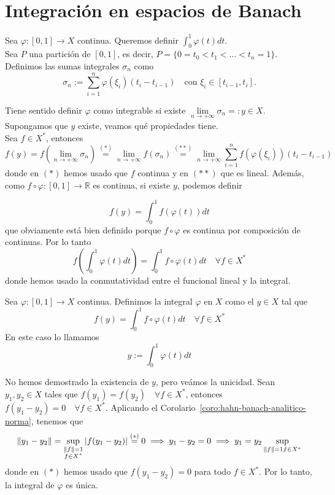 \section{Integración en espacios de Banach}


\noindent 
Sea $\varphi: [0, 1] \to X$ continua. Queremos definir $\int_{0}^{1} \varphi(t) dt$. \\

\noindent 
Sea $P$ una partición de $[0, 1]$, es decir, $P = \{0 = t_0 < t_1 < \dots < t_n = 1\}$. Definimos las sumas integrales $\sigma_n$ como
\[ \sigma_n := \sum_{i=1}^{n} \varphi(\xi_i)(t_i - t_{i-1}) \quad \text{con } \xi_i \in [t_{i-1}, t_i]. \]

\vspace{0.4cm}

\noindent 
Tiene sentido definir $\varphi$ como integrable si existe $\lim\limits_{n \to +\infty} \sigma_n =: y \in X$. Supongamos que $y$ existe, veamos qué propiedades tiene. \\

\noindent 
Sea $f \in X^*$, entonces 
\begin{equation*}
    f(y)=f\left(\lim_{n\to +\infty}\sigma_n\right) \overset{(*)}{=} \lim_{n\to + \infty} f(\sigma_n) \overset{(**)}{=} \lim_{n \to +\infty} \sum_{i=1}^{n} f(\varphi(\xi_i))(t_i - t_{i-1})
\end{equation*}
donde en $(*)$ hemos usado que $f$ continua y en $(**)$ que es lineal. Además, como
$f \circ \varphi: [0, 1] \to \mathbb{R}$ es continua, si existe $y$, podemos definir 

$$f(y) = \int_{0}^{1} f(\varphi(t)) dt$$
que obviamente está bien definido porque $f \circ \varphi$ es continua por composición de continuas. Por lo tanto
$$f\left( \int_{0}^{1} \varphi(t) dt \right) = \int_{0}^{1} f \circ \varphi(t) dt \quad \forall f \in X^*$$
donde hemos usado la conmutatividad entre el funcional lineal y la integral.

\begin{definicion}
    Sea $\varphi: [0, 1] \to X$ continua. Definimos la integral $\varphi$ en $X$ como el  $y \in X$ tal que 
    $$f(y) = \int_{0}^{1} f \circ \varphi(t) dt \quad \forall f \in X^*$$
    En este caso lo llamamos 
    $$y := \int_{0}^{1} \varphi(t) dt$$
\end{definicion}

\begin{observacion}
    No hemos demostrado la existencia de $y$, pero veámos la unicidad. Sean $y_1, y_2 \in X$ tales que $f(y_1) = f(y_2) \quad \forall f \in X^*$, entonces $f(y_1 - y_2) = 0 \quad \forall f \in X^*$. Aplicando el \mbox{Corolario \ref{coro:hahn-banach-analitico-norma}}, tenemos que 
    \begin{equation*}
        \|y_1 - y_2\| = \sup_{\substack{\|f\|=1 \\ f \in X^*}} |f(y_1 - y_2)| \overset{(*)}{=} 0 \implies y_1 - y_2 = 0 \implies y_1 = y_2\sup_{\|f\|=1 \\ f\in X^*} 
    \end{equation*}
    donde en $(*)$ hemos usado que $f(y_1 - y_2) = 0$ para todo $f \in X^*$. Por lo tanto, la integral de $\varphi$ es única.
\end{observacion}


